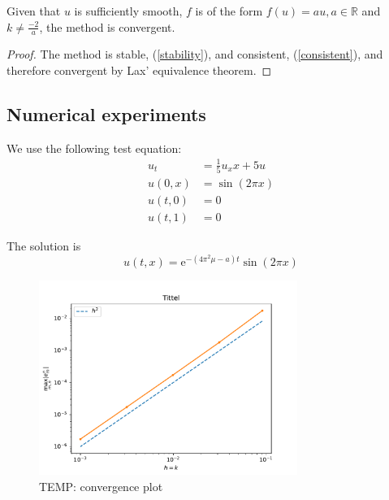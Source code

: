 \begin{theorem}
    Given that $u$ is sufficiently smooth,  $f$ is of the form $f(u)=au, a\in \mathbb{R}$ and $k \neq \frac{-2}{a}$, the method is convergent.
\end{theorem}

\begin{proof}
    The method is stable, (\ref{stability}), and consistent, (\ref{consistent}), and therefore convergent by Lax' equivalence theorem.
\end{proof}
\subsection{Numerical experiments}

We use the following test equation:
\begin{align}
  u_t &= \frac{1}{5}u_xx + 5 u \\
  u(0, x) &= \sin (2\pi x) \\
  u(t, 0) &= 0 \\
  u(t, 1) &= 0
\end{align}

The solution is
\begin{equation}
  \label{eq:anal_sol}
  u(t, x) = \text{e}^{-(4\pi^2 \mu - a)t}\sin(2\pi x)
\end{equation}

\begin{figure}[h]
    \centering
    \includegraphics[width=0.75\textwidth]{Images/plots/temp_task1.pdf}
    \caption{TEMP: convergence plot}
    \label{fig:mesh1}
\end{figure}

